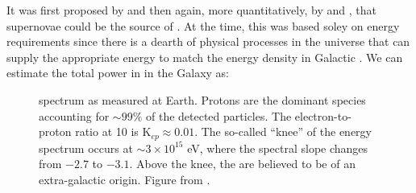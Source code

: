 It was first proposed by \cite{Baade34} and then again, more quantitatively, by \cite{Ginzburg64} and \cite{Hayakawa69}, that supernovae could be the source of \crs{}. At the time, this was based soley on energy requirements since  there is a dearth of physical processes in the universe that can supply the appropriate energy to match the energy density in Galactic \crs{}. We can estimate the total power in \crs{} in the Galaxy as:

\begin{figure}[h!]%
	\centering
	\caption[\cray{} spectrum as measured at Earth]{\cray{} spectrum as measured at Earth. Protons are the dominant species accounting for  $\sim 99\%$ of the detected particles. The electron-to-proton ratio at 10\gev{} is  K$_{ep} \approx 0.01$. The so-called ``knee'' of the \cray{} energy spectrum occurs at $\sim 3\times 10^{15}$ eV, where the \pl{} spectral slope changes from $-2.7$ to $-3.1$. Above the knee, the \crs{} are believed to be of an extra-galactic origin. Figure from \cite{Blasi13}.
	\label{fig:CRspec}} 
\end{figure}

